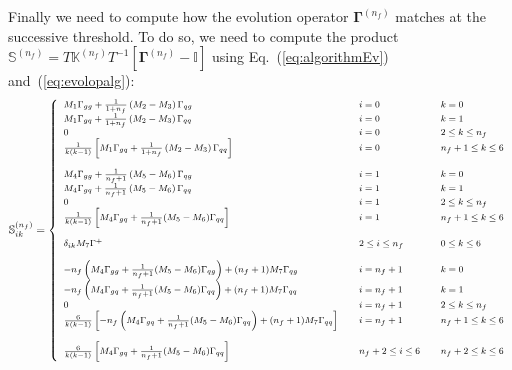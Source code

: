 \documentclass[10pt,a4paper]{article}
\begin{document}
Finally we need to compute how the evolution operator
${\bm\Gamma}^{(n_f)}$ matches at the successive threshold. To do so,
we need to compute the product
$\mathbb{S}^{(n_f)}=T\mathbb{K}^{(n_f)} T^{-1}
\left[{\bm\Gamma}^{(n_f)}-\mathbb{I}\right]$
using Eq.~(\ref{eq:algorithmEv}) and~(\ref{eq:evolopalg}):
\begin{equation}
\footnotesize
\mathbb{S}_{ik}^{(n_f)} =
\left\{
\begin{array}{lll}
M_1\Gamma_{gg}+\frac{1}{1+n_f}\left(M_2-M_3\right)\Gamma_{qg} &
                                                                      \quad i = 0 &\quad k = 0\\
M_1\Gamma_{gq}+\frac{1}{1+n_f}\left(M_2-M_3\right)\Gamma_{qq} & \quad i = 0 &\quad k =1\\
0 & \quad i = 0 &\quad  2\leq k \leq n_f\\
\frac1{k(k-1)}\left[M_1\Gamma_{gq}+\frac{1}{1+n_f}\left(M_2-M_3\right)\Gamma_{qq}\right] & \quad i = 0 &\quad  n_f+ 1\leq k \leq 6\\
\\
M_4\Gamma_{gg}+\frac{1}{n_f+1}\left(M_5-M_6\right)\Gamma_{qg} & \quad i = 1&\quad  k=0\\
M_4\Gamma_{gq}+\frac{1}{n_f+1}\left(M_5-M_6\right)\Gamma_{qq}& \quad i = 1 &\quad  k=1\\
0 & \quad i = 1 &\quad  2\leq k \leq n_f\\
\frac{1}{k(k-1)}\left[M_4\Gamma_{gq}+\frac{1}{n_f+1}(M_5-M_6)\Gamma_{qq}\right] & \quad i = 1 &\quad  n_f+1\leq k\leq 6\\
\\
\delta_{ik}M_7\Gamma^+&\quad 2\leq i \leq n_f &\quad 0\leq k
                                                         \leq 6\\
\\
-n_f\left(M_4\Gamma_{gg}+\frac{1}{n_f+1}(M_5-M_6)\Gamma_{qg}\right)+(n_f+1)M_7\Gamma_{qg}&\quad i = n_f+1 &\quad k =0\\
-n_f\left(M_4\Gamma_{gq}+\frac{1}{n_f+1}(M_5-M_6)\Gamma_{qq}\right)+(n_f+1)M_7\Gamma_{qq}&\quad i = n_f+1 &\quad k =1\\
0 & \quad i = n_f+1 &\quad  2\leq k \leq n_f\\
  \frac{6}{k(k-1)}\left[-n_f\left(M_4\Gamma_{gq}+\frac{1}{n_f+1}(M_5-M_6)\Gamma_{qq}\right)+(n_f+1)M_7\Gamma_{qq}\right]
&\quad i = n_f+1 &\quad n_f+1 \leq k \leq 6\\
\\
  \frac{6}{k(k-1)}\left[M_4\Gamma_{gq}+\frac{1}{n_f+1}(M_5-M_6)\Gamma_{qq} \right]
& \quad n_f+2\leq i \leq 6 &\quad  n_f+
                                                            2\leq k
                                                            \leq 6\\
\end{array}
\right.
\end{equation}
\end{document}
